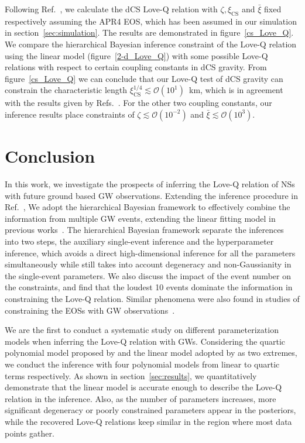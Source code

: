 \documentclass[a4paper,11pt]{article}
\begin{document}
Following Ref.~\cite{Yagi_2017}, we calculate the dCS Love-Q relation with $\zeta, \xi_{\mathrm{CS}}$ and $\bar{\xi}$ 
fixed respectively assuming the APR4 EOS, which has been assumed in our simulation 
in section~\ref{sec:simulation}. The results are demonstrated in figure~\ref{cs_Love_Q}. 
We compare the hierarchical Bayesian inference constraint of the Love-Q relation 
using the linear model (figure~\ref{2-d_Love_Q}) with some possible Love-Q 
relations with respect to certain coupling constants in dCS gravity. From 
figure~\ref{cs_Love_Q} we can conclude that our Love-Q test of dCS gravity can 
constrain the characteristic length $\xi_{\mathrm{CS}}^{1/4} \lesssim \mathcal{O}(10^1)$~km, 
which is in agreement with the results given by Refs.~\cite{Yagi:2013bca,Yagi:2013awa}. 
For the other two coupling constants, our inference results place constraints of 
$\zeta \lesssim \mathcal{O}(10^{-2})$ and $\bar{\xi} \lesssim \mathcal{O}(10^{3})$.

\section{Conclusion}
\label{sec:conclusion}

In this work, we investigate the prospects of inferring the Love-Q relation of NSs
with future ground based GW observations.
Extending the inference procedure in
Ref.~\cite{Samajdar:2020xrd}, 
We adopt the hierarchical Bayesian framework to effectively combine the
information from multiple GW events, extending the linear fitting model in
previous works~\cite{Samajdar:2020xrd}. The hierarchical Bayesian framework
separate the inferences into two steps, the auxiliary single-event
inference and the hyperparameter inference, which avoids a direct high-dimensional
inference for all the parameters simultaneously while still takes into account
degeneracy and non-Gaussianity in the single-event parameters. We also discuss
the impact of the event number on the constraints, and find that the loudest 10 events
dominate the information in constraining the Love-Q relation. Similar phenomena
were also found in studies of constraining the EOSs with GW observations~\cite{Lackey:2014fwa,Landry:2020vaw,Pang:2020ilf,Finstad:2022oni,Bandopadhyay:2024zrr,Wang:2024xon}.

We are the first to conduct a systematic study on different parameterization models
when inferring the Love-Q relation with GWs. Considering the quartic polynomial
model proposed by \citet{Yagi:2013awa} and the linear model adopted by
\citet{Samajdar:2020xrd} as two extremes, we conduct the inference with
four polynomial models
from linear to quartic terms respectively. As shown in
section~\ref{sec:results}, we quantitatively demonstrate that
the linear model is accurate enough to describe the Love-Q relation in the
inference. Also, as the number of parameters increases, more significant
degeneracy or poorly constrained parameters appear in the posteriors, while the recovered Love-Q relations keep similar in the region where most data points gather.
\end{document}
